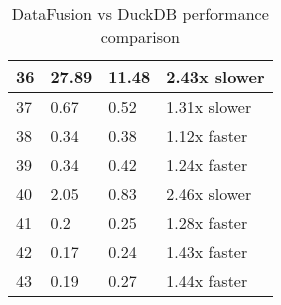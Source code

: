 \begin{table}[h]
\begin{tabular}{|l|l|l|l|}
\hline
36 & 27.89 & 11.48 & 2.43x slower \\
\hline
37 & 0.67 & 0.52 & 1.31x slower \\
\hline
38 & 0.34 & 0.38 & 1.12x faster \\
\hline
39 & 0.34 & 0.42 & 1.24x faster \\
\hline
40 & 2.05 & 0.83 & 2.46x slower \\
\hline
41 & 0.2 & 0.25 & 1.28x faster \\
\hline
42 & 0.17 & 0.24 & 1.43x faster \\
\hline
43 & 0.19 & 0.27 & 1.44x faster \\
\hline
\end{tabular}
\caption{DataFusion vs DuckDB performance comparison}
\label{table:1}
\end{table}